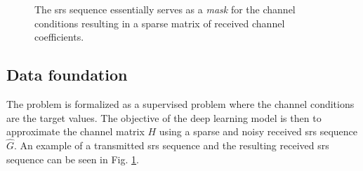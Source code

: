 \begin{figure}
    \centering
    \vspace{2em}
    \caption{The \gls{srs} sequence essentially serves as a \emph{mask} for the channel conditions resulting in a sparse matrix of received channel coefficients.}
    \label{fig:srs_sequence_example}
\end{figure}

\subsection{Data foundation}
The problem is formalized as a supervised problem where the channel conditions are the target values. The objective of the deep learning model is then to approximate the channel matrix $H$ using a sparse and noisy received \gls{srs} sequence $\hat{G}$. An example of a transmitted \gls{srs} sequence and the resulting received \gls{srs} sequence can be seen in Fig. \ref{fig:srs_sequence_example}. 

